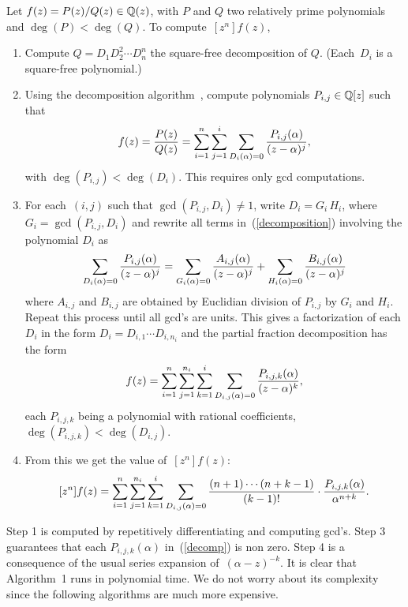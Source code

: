 \begin{alg}\label{exact}
Let $f(z)=P(z)/Q(z) \in {\Bbb Q}(z)$, with $P$ and $Q$ two relatively prime
polynomials and $\deg(P) < \deg(Q)$. To compute~$[z^n]f(z)$,
\begin{enumerate}
\item Compute $Q=D_1D_2^2\cdots D_n^n$ the square-free decomposition
of $Q$. (Each~$D_i$ is a square-free polynomial.)
\item Using the decomposition algorithm~\cite{BrSa92}, compute
polynomials $P_{i,j}\in{\Bbb Q}[z]$ such that
\begin{equation}\label{decomposition}
f(z)={P(z) \over Q(z)}=\sum_{i=1}^n\sum_{j=1}^i
\sum_{D_i(\alpha)=0} 
{P_{i,j}(\alpha) \over (z-\alpha)^j},
\end{equation}
 with $\deg(P_{i,j})<\deg(D_i)$. This requires only gcd computations.
\item For each~$(i,j)$ such that $\gcd(P_{i,j},D_i)\neq1$, write
$D_i=G_i\,H_i$, where 
$G_i=\gcd(P_{i,j},D_i)$ and rewrite all terms in~(\ref{decomposition}) involving the polynomial $D_i$ as
$$ \sum_{D_i(\alpha)=0} {P_{i,j}(\alpha) \over
(z-\alpha)^j} =
\sum_{G_i(\alpha)=0} {A_{i,j}(\alpha) \over
(z-\alpha)^j} +
\sum_{H_i(\alpha)=0} {B_{i,j}(\alpha) \over
(z-\alpha)^j} $$
where $A_{i,j}$ and $B_{i,j}$ are obtained by Euclidian
division of $P_{i,j}$ by $G_i$ and $H_i$.
Repeat this process until all gcd's are units. This gives
a factorization of each $D_i$ in the form $D_i=D_{i,1}\cdots D_{i,n_i}$
and the partial  fraction decomposition has the form
\begin{equation}\label{decomp}
f(z)=\sum_{i=1}^n \sum_{j=1}^{n_i}\sum_{k=1}^i 
\sum_{D_{i,j}(\alpha)=0} {P_{i,j,k}(\alpha) \over
(z-\alpha)^k},
\end{equation}
each $P_{i,j,k}$ being a polynomial with rational coefficients,
$\deg(P_{i,j,k})<\deg(D_{i,j})$.
\item From this we get the value of~$[z^n]f(z)$:
\begin{equation}\label{expansion}
[z^n]f(z)=\sum_{i=1}^n \sum_{j=1}^{n_i}\sum_{k=1}^i
\sum_{D_{i,j}(\alpha)=0} 
{ (n+1) \cdots (n+k-1) \over (k-1)!} \cdot {P_{i,j,k}(\alpha) \over
\alpha^{n+k}}.
\end{equation} 
\end{enumerate}
\end{alg}

Step 1 is computed by repetitively differentiating and computing
gcd's. Step 3  guarantees that each
$P_{i,j,k}(\alpha)$ in~(\ref{decomp}) is non zero. Step 4 is a
consequence of the usual series expansion of~$(\alpha-z)^{-k}$.
It is clear that Algorithm~1 runs in polynomial time. We do
not worry about its complexity since the following algorithms are much
more expensive.

